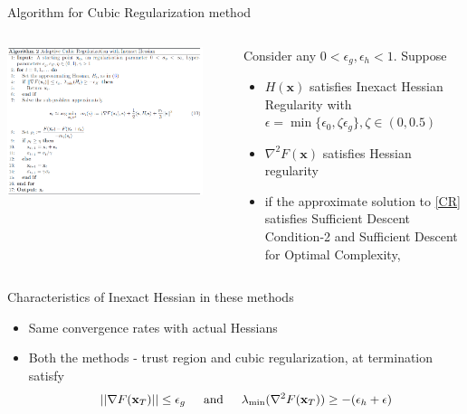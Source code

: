\documentclass{beamer}
\newcommand{\h}{\nabla^{2}}
\newcommand{\g}{\nabla}
\newcommand{\xbold}{\mathbf{x}}
\newcommand{\mineig}{\lambda_{\min}}
\begin{document}
\begin{frame}{Algorithm for Cubic Regularization method}
\begin{columns}
\centering
\includegraphics[width=0.9\textwidth]{./images/algo-2.png}
\begin{theorem}
Consider any \(0 < \epsilon_{g}, \epsilon_{h} < 1\). Suppose
\begin{itemize}
\item<1->{\(H(\xbold)\) satisfies Inexact Hessian Regularity with \(\epsilon = \min\{\epsilon_{0}, \zeta \epsilon_{g}\}, \zeta \in (0, 0.5)\)}
\item<2->{\(\h F(\xbold)\) satisfies Hessian regularity}
\item<3->{if the approximate solution to \ref{CR} satisfies Sufficient Descent Condition-2 and Sufficient Descent for Optimal Complexity}, 
\end{itemize}
\end{theorem}
\end{columns}
\end{frame}

\begin{frame}{Characteristics of Inexact Hessian in these methods}
\begin{itemize}
\item<1->{Same convergence rates with actual Hessians}
\item<2->{Both the methods - trust region and cubic regularization, at termination satisfy
  \begin{equation*}
  ||\g F(\xbold_{T})|| \leq \epsilon_{g} \hspace{4mm} \text{ and } \hspace{4mm} \mineig(\h F(\xbold_{T})) \geq -(\epsilon_{h} + \epsilon)
  \end{equation*}
} 
\end{itemize}
\end{frame}
\end{document}
